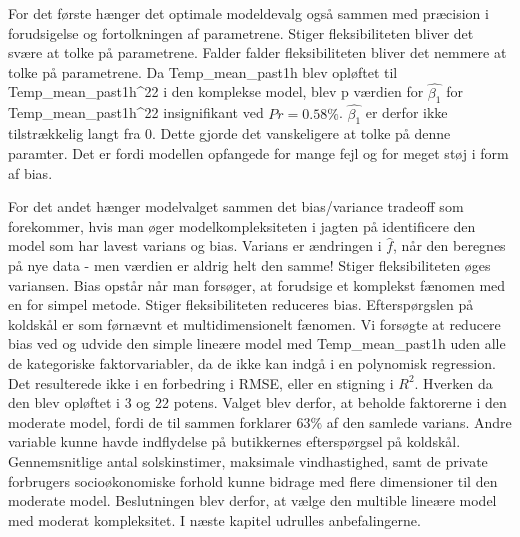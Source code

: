 \documentclass[
  12pt,
  a4paper,
  DIV=11,
  numbers=noendperiod,
  oneside,
  open=any]{scrartcl}
\begin{document}
For det første hænger det optimale modeldevalg også sammen med præcision
i forudsigelse og fortolkningen af parametrene. Stiger fleksibiliteten
bliver det svære at tolke på parametrene. Falder falder fleksibiliteten
bliver det nemmere at tolke på parametrene. Da Temp\_mean\_past1h blev
opløftet til Temp\_mean\_past1h\^{}22 i den komplekse model, blev p
værdien for \(\hat{\beta_1}\) for Temp\_mean\_past1h\^{}22 insignifikant
ved \(Pr = 0.58\%\). \(\hat{\beta_1}\) er derfor ikke tilstrækkelig
langt fra \(0\). Dette gjorde det vanskeligere at tolke på denne
paramter. Det er fordi modellen opfangede for mange fejl og for meget
støj i form af bias.

For det andet hænger modelvalget sammen det bias/variance tradeoff som
forekommer, hvis man øger modelkompleksiteten i jagten på identificere
den model som har lavest varians og bias. Varians er ændringen i
\(\hat{f}\), når den beregnes på nye data - men værdien er aldrig helt
den samme! Stiger fleksibiliteten øges variansen. Bias opstår når man
forsøger, at forudsige et komplekst fænomen med en for simpel metode.
Stiger fleksibiliteten reduceres bias. Efterspørgslen på koldskål er som
førnævnt et multidimensionelt fænomen. Vi forsøgte at reducere bias ved
og udvide den simple lineære model med Temp\_mean\_past1h uden alle de
kategoriske faktorvariabler, da de ikke kan indgå i en polynomisk
regression. Det resulterede ikke i en forbedring i RMSE, eller en
stigning i \(R^2\). Hverken da den blev opløftet i 3 og 22 potens.
Valget blev derfor, at beholde faktorerne i den moderate model, fordi de
til sammen forklarer \(63\%\) af den samlede varians. Andre variable
kunne havde indflydelse på butikkernes efterspørgsel på koldskål.
Gennemsnitlige antal solskinstimer, maksimale vindhastighed, samt de
private forbrugers socioøkonomiske forhold kunne bidrage med flere
dimensioner til den moderate model. Beslutningen blev derfor, at vælge
den multible lineære model med moderat kompleksitet. I næste kapitel
udrulles anbefalingerne.
\end{document}
